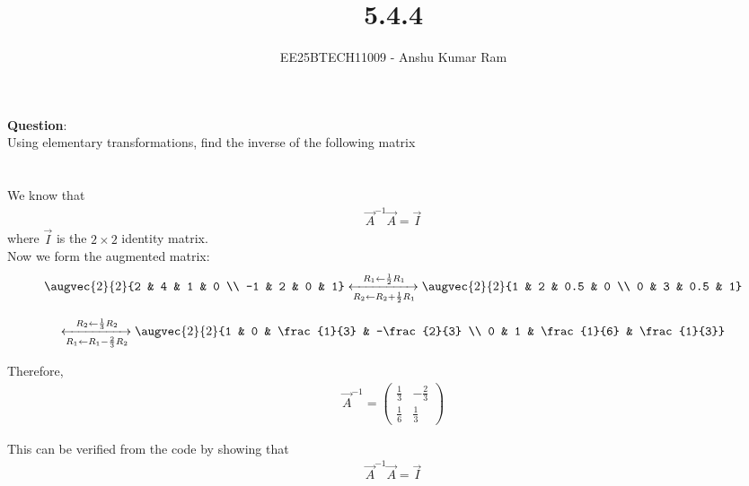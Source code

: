 \documentclass[journal]{IEEEtran}
\begin{document}

\vspace{3cm}

\title{5.4.4}
\author{EE25BTECH11009 - Anshu Kumar Ram}
\maketitle
{\let\newpage\relax\maketitle}

\renewcommand{\thefigure}{\theenumi}
\renewcommand{\thetable}{\theenumi}
\setlength{\intextsep}{10pt}

\renewcommand{\thetable}{\theenumi}

\textbf{Question}:\\
Using elementary transformations, find the inverse of the following matrix\\
 \\

\solution \\
We know that
\begin{align}
\vec{A}^{-1}\vec{A} = \vec{I}
\end{align}
where $\vec{I}$ is the $2\times2$ identity matrix.\\

Now we form the augmented matrix:
\begin{align}
\augvec{2}{2}{2 & 4 & 1 & 0 \\ -1 & 2 & 0 & 1}
\xleftrightarrow[R_2 \leftarrow R_2 + \frac{1}{2}R_1]{R_1 \leftarrow \frac{1}{2}R_1}
\augvec{2}{2}{1 & 2 & 0.5 & 0 \\ 0 & 3 & 0.5 & 1}
\end{align}

\begin{align}
\xleftrightarrow[R_1 \leftarrow R_1 - \frac{2}{3}R_2]{R_2 \leftarrow \frac{1}{3}R_2}
\augvec{2}{2}{1 & 0 & \frac{1}{3} & -\frac{2}{3} \\ 0 & 1 & \frac{1}{6} & \frac{1}{3}}
\end{align}

Therefore,
\begin{align}
\vec{A}^{-1} =
\begin{pmatrix}
\frac{1}{3} & -\frac{2}{3} \\
\frac{1}{6} & \frac{1}{3}
\end{pmatrix}
\end{align}

This can be verified from the code by showing that
\begin{align}
\vec{A}^{-1}\vec{A} = \vec{I}
\end{align}
\end{document}
